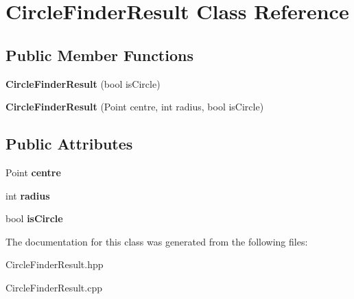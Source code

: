 \hypertarget{classCircleFinderResult}{}\section{Circle\+Finder\+Result Class Reference}
\label{classCircleFinderResult}
\subsection*{Public Member Functions}
\begin{DoxyCompactItemize}
\item 
{\bfseries Circle\+Finder\+Result} (bool is\+Circle)\hypertarget{classCircleFinderResult_ad07edae86537838f212e586595e05b00}{}\label{classCircleFinderResult_ad07edae86537838f212e586595e05b00}

\item 
{\bfseries Circle\+Finder\+Result} (Point centre, int radius, bool is\+Circle)\hypertarget{classCircleFinderResult_a520a0d45adf3ed5700f87f3eabdbe97c}{}\label{classCircleFinderResult_a520a0d45adf3ed5700f87f3eabdbe97c}

\end{DoxyCompactItemize}
\subsection*{Public Attributes}
\begin{DoxyCompactItemize}
\item 
Point {\bfseries centre}\hypertarget{classCircleFinderResult_a5e521162d00f1c37484017274595037e}{}\label{classCircleFinderResult_a5e521162d00f1c37484017274595037e}

\item 
int {\bfseries radius}\hypertarget{classCircleFinderResult_a8b184dfa60cfff1403ef9eef5258abdc}{}\label{classCircleFinderResult_a8b184dfa60cfff1403ef9eef5258abdc}

\item 
bool {\bfseries is\+Circle}\hypertarget{classCircleFinderResult_a1c6eeba1874d040f770791f8779f666a}{}\label{classCircleFinderResult_a1c6eeba1874d040f770791f8779f666a}

\end{DoxyCompactItemize}


The documentation for this class was generated from the following files\+:\begin{DoxyCompactItemize}
\item 
Circle\+Finder\+Result.\+hpp\item 
Circle\+Finder\+Result.\+cpp\end{DoxyCompactItemize}

